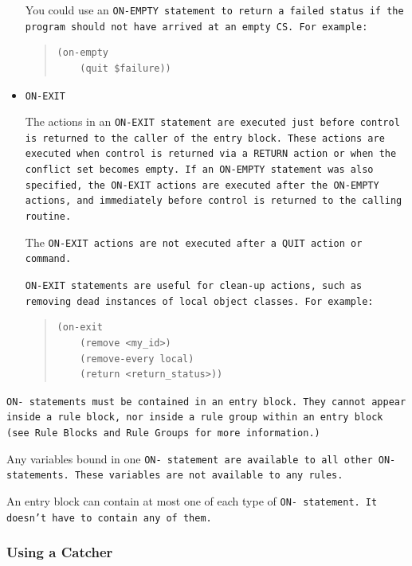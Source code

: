 \begin{itemize}
  You could use an \tt{ON-EMPTY} statement to return a failed status
  if the program should not have arrived at an empty CS.  For example:
  \begin{quote}
\begin{verbatim}
(on-empty
    (quit $failure))
\end{verbatim}
  \end{quote}
        
\item \tt{ON-EXIT}

  The actions in an \tt{ON-EXIT} statement are executed just before
  control is returned to the caller of the entry block. These actions
  are executed when control is returned via a \tt{RETURN} action or
  when the conflict set becomes empty. If an \tt{ON-EMPTY} statement
  was also specified, the \tt{ON-EXIT} actions are executed after the
  \tt{ON-EMPTY} actions, and immediately before control is returned to
  the calling routine.

  The \tt{ON-EXIT} actions are not executed after a \tt{QUIT} action
  or command.

  \tt{ON-EXIT} statements are useful for clean-up actions, such as
  removing dead instances of local object classes. For example:

  \begin{quote}
\begin{verbatim}
(on-exit
    (remove <my_id>)
    (remove-every local)
    (return <return_status>))
\end{verbatim}
  \end{quote}

\end{itemize}

\tt{ON-} statements must be contained in an entry block. They cannot
appear inside a rule block, nor inside a rule group within an entry
block (see Rule Blocks and Rule Groups for more information.)

\begin{note}
  Any variables bound in one \tt{ON-} statement are available to all
  other \tt{ON-} statements. These variables are not available to any
  rules.
\end{note}

An entry block can contain at most one of each type of \tt{ON-}
statement. It doesn't have to contain any of them.

\subsubsection*{Using a Catcher}

